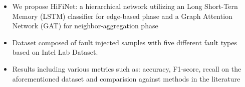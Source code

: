 \begin{itemize}
  \item We propose HiFiNet: a hierarchical network utilizing an Long Short-Tern Memory (LSTM) classifier for edge-based phase and a Graph Attention
    Network (GAT) for neighbor-aggregation phase
  \item Dataset composed of fault injected samples with five different fault types based on Intel Lab Dataset.
  \item Results including various metrics such as: accuracy, F1-score, recall on the aforementioned dataset and comparision against methods in the
    literature
\end{itemize}
